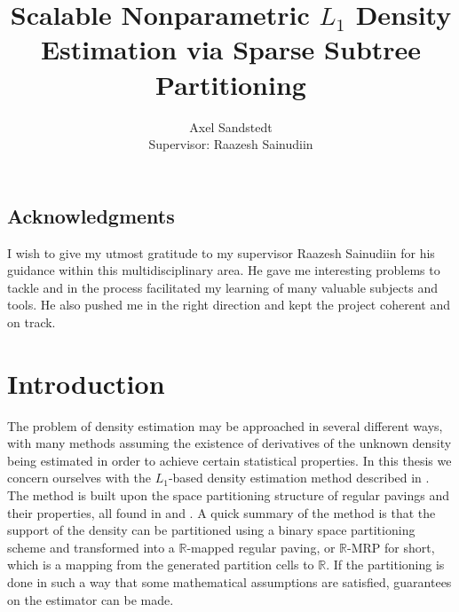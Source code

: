 \documentclass{report}
\begin{document}
\title{Scalable Nonparametric $L_1$ Density Estimation via Sparse Subtree Partitioning}
\author{Axel Sandstedt\\{\small Supervisor: Raazesh Sainudiin}}
\maketitle

\newpage
{}
\newpage
\section*{Acknowledgments}
I wish to give my utmost gratitude to my supervisor Raazesh Sainudiin for his guidance within this multidisciplinary area. He gave me interesting problems to tackle
and in the process facilitated my learning of many valuable subjects and tools. He also pushed me in the right direction and kept the project coherent and on track.

\newpage
\tableofcontents
\newpage

\chapter*{Introduction}
The problem of density estimation may be approached in several different ways, with many methods assuming the existence of derivatives of the unknown density being estimated in order to achieve certain statistical properties. In this thesis we concern ourselves with 
the $L_1$-based density estimation method described in \cite{MDE}. The method is built upon the space partitioning structure of regular pavings and their properties, all found in \cite{Mapped Regular Pavings} and \cite{MDE}.
A quick summary of the method is that the support of the density can be partitioned using a binary space partitioning scheme and transformed into a $\mathbb{R}$-mapped regular paving, or $\mathbb{R}$-MRP for short, 
which is a mapping from the generated partition cells to $\mathbb{R}$. If the partitioning is done in such a way that some mathematical assumptions are satisfied, guarantees on the estimator can be made.
\end{document}
